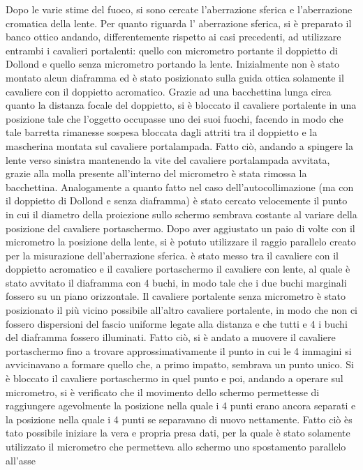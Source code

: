  Dopo le varie stime del fuoco, si sono cercate l'aberrazione sferica e l'aberrazione cromatica della lente. Per quanto riguarda l'
 aberrazione sferica, si è preparato il banco ottico andando, differentemente rispetto ai casi precedenti, ad utilizzare entrambi
 i cavalieri portalenti: quello con micrometro portante il doppietto di Dollond e quello senza micrometro portando la lente.
 Inizialmente non è stato montato alcun diaframma ed è stato posizionato sulla guida ottica solamente il cavaliere con il
 doppietto acromatico. Grazie ad una bacchettina lunga circa quanto la distanza focale del doppietto, si è bloccato il
 cavaliere portalente in una posizione tale che l'oggetto occupasse uno dei suoi fuochi, facendo in modo che tale barretta rimanesse
 sospesa bloccata dagli attriti tra il doppietto e la mascherina montata sul cavaliere portalampada. Fatto ciò, andando a spingere
 la lente verso sinistra mantenendo la vite del cavaliere portalampada avvitata, grazie alla molla presente all'interno del
 micrometro è stata rimossa la bacchettina. Analogamente a quanto fatto nel caso dell'autocollimazione (ma con il doppietto di Dollond
 e senza diaframma) è stato cercato velocemente il punto in cui il diametro della proiezione sullo schermo sembrava costante al
 variare della posizione del cavaliere portaschermo. Dopo aver aggiustato un paio di volte con il micrometro la posizione della
 lente, si è potuto utilizzare il raggio parallelo creato per la misurazione dell'aberrazione sferica. è stato messo tra il cavaliere
 con il doppietto acromatico e il cavaliere portaschermo il cavaliere con lente, al quale è stato avvitato il diaframma con 4 buchi,
 in modo tale che i due buchi marginali fossero su un piano orizzontale. Il cavaliere portalente senza micrometro è stato posizionato
 il più vicino possibile all'altro cavaliere portalente, in modo che non ci fossero dispersioni del fascio uniforme legate alla
 distanza e che tutti e 4 i buchi del diaframma fossero illuminati. Fatto ciò, si è andato a muovere il cavaliere portaschermo fino a
 trovare approssimativamente il punto in cui le 4 immagini si avvicinavano a formare quello che, a primo impatto, sembrava un
punto unico. Si è bloccato il cavaliere portaschermo in quel punto e poi, andando a operare sul micrometro, si è verificato
 che il movimento dello schermo permettesse di raggiungere agevolmente la posizione nella quale i 4 punti erano ancora separati e
 la posizione nella quale i 4 punti se separavano di nuovo nettamente. Fatto ciò ès tato possibile iniziare la vera e propria presa
 dati, per la quale è stato solamente utilizzato il micrometro che permetteva allo schermo uno spostamento parallelo all'asse
